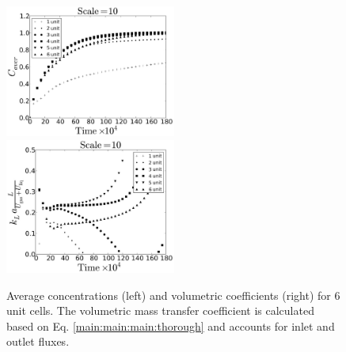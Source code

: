 \documentclass[review,12pt]{elsarticle}
\begin{document}
\begin{figure}[htb!]
\includegraphics[width=0.5\textwidth]{aver_units6scale10.eps}\hfill
\includegraphics[width=0.5\textwidth]{right_def_6scale10.eps}\\
\caption{Average concentrations (left) and volumetric coefficients (right) for $6$ unit cells. The
volumetric
mass transfer coefficient is calculated based on Eq. \ref{main:main:main:thorough} and accounts for inlet
and outlet fluxes. \label{fig:unit:6}}
\end{figure}
\end{document}
